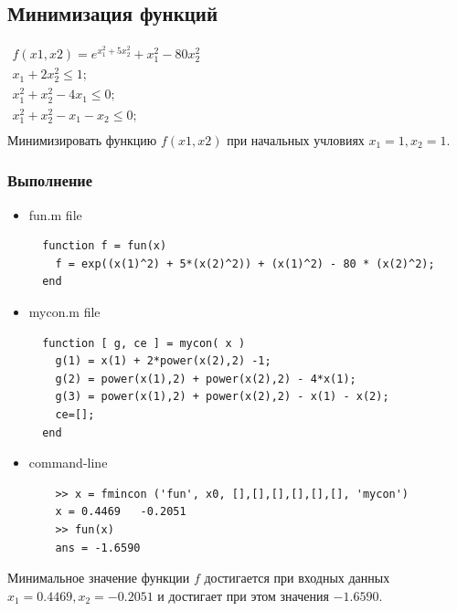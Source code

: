 \documentclass{article}
\begin{document}
 \newpage
\subsection{Минимизация функций}
\begin{math}
\begin{array}{l}
  f(x1, x2) = e^{x_1^2 + 5x_2^2} + x_1^2 - 80 x_2^2\\
  x_1 + 2x_2^2 \leq 1;\\
  x_1^2 + x_2^2 - 4x_1 \leq 0;\\
  x_1^2 + x_2^2 - x_1 - x_2 \leq 0;\\
\end{array}
\end{math}\\
Минимизировать функцию $f(x1, x2)$ при начальных учловиях $x_1 = 1, x_2 = 1$.
\subsubsection{Выполнение}
\begin{itemize}
  \item fun.m file
  \begin{lstlisting}
  function f = fun(x)
    f = exp((x(1)^2) + 5*(x(2)^2)) + (x(1)^2) - 80 * (x(2)^2);
  end
  \end{lstlisting}
  
  \item mycon.m file
  \begin{lstlisting}
  function [ g, ce ] = mycon( x )
    g(1) = x(1) + 2*power(x(2),2) -1;
    g(2) = power(x(1),2) + power(x(2),2) - 4*x(1);
    g(3) = power(x(1),2) + power(x(2),2) - x(1) - x(2);
    ce=[];
  end
  \end{lstlisting}
  
  \item command-line
  \begin{lstlisting}
    >> x = fmincon ('fun', x0, [],[],[],[],[],[], 'mycon')
    x = 0.4469   -0.2051
    >> fun(x)
    ans = -1.6590
  \end{lstlisting}
\end{itemize}
Минимальное значение функции $f$ достигается при входных данных 
$x_1 = 0.4469, x_2 = -0.2051$ и достигает при этом значения $-1.6590$. 
\end{document}

